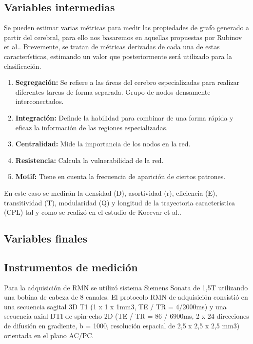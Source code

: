 \documentclass[fleqn,10pt]{UICArticle} %
\begin{document}
\subsection{Variables intermedias}
Se pueden estimar varias métricas para medir las propiedades de grafo generado a partir del cerebral, para ello nos basaremos en aquellas propuestas por Rubinov et al.\cite{Rubinov2010}. Brevemente, se tratan de métricas derivadas de cada una de estas características, estimando un valor que posteriormente será utilizado para la clasificación.

\begin{enumerate}[noitemsep]
\item \textbf{Segregación:} Se refiere a las áreas del cerebro especializadas para realizar diferentes tareas de forma separada. Grupo de nodos densamente interconectados.
\item \textbf{Integración:} Definde la habilidad para combinar de una forma rápida y eficaz la información de las regiones especializadas.
\item \textbf{Centralidad:} Mide la importancia de los nodos en la red.
\item \textbf{Resistencia:} Calcula la vulnerabilidad de la red.
\item \textbf{Motif:} Tiene en cuenta la frecuencia de aparición de ciertos patrones.
\end{enumerate}

En este caso se medirán la densidad (D), asortividad (r), eficiencia (E), transitividad (T), modularidad (Q) y longitud de la trayectoria característica (CPL) tal y como se realizó en el estudio de Kocevar et al.\cite{Kocevar2016}.

\subsection{Variables finales}


\subsection{Instrumentos de medición}
Para la adquisición de RMN se utilizó sistema Siemens Sonata de 1,5T utilizando una bobina de cabeza de 8 canales. El protocolo RMN de adquisición consistió en una secuencia sagital 3D T1 (1 x 1 x 1mm3, TE / TR = 4/2000ms) y una secuencia axial DTI de spin-echo 2D (TE / TR = 86 / 6900ms, 2 x 24 direcciones de difusión en gradiente, b = 1000, resolución espacial de 2,5 x 2,5 x 2,5 mm3) orientada en el plano AC/PC.
\end{document}
